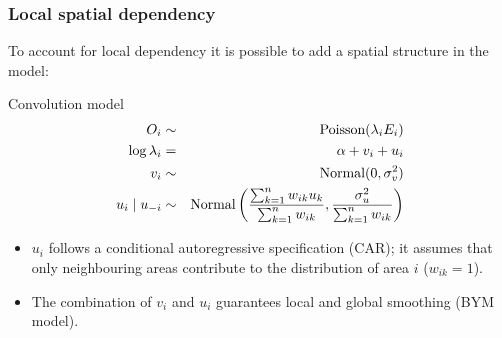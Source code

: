 \documentclass[slidestop,compress,serif,10pt]{beamer}
\begin{document}
\begin{frame}\frametitle{Local spatial dependency}

To account for local dependency it is possible to add a spatial structure in the model:
\begin{block}{Convolution model}
\vspace{-0.5cm}
\begin{eqnarray*}
O_i & \sim & \hbox{Poisson}(\lambda_i E_i) \\
\log \lambda_i & = & \alpha + v_i + u_i\\
v_i & \sim  & \hbox{Normal}(0, \sigma_v^2)\\
u_i \mid u_{-i} & \sim & \hbox{Normal}\left(\frac{\sum_{k=1}^n w_{ik} u_k}{\sum_{k=1}^n w_{ik}}, \frac{\sigma^2_u}{\sum_{k=1}^n w_{ik}}\right)\end{eqnarray*}
\end{block}
\begin{itemize}
  \item $u_i$ follows a conditional autoregressive specification (CAR); it assumes that only neighbouring areas contribute to the distribution of area $i$ ($w_{ik}=1$).
  \item The combination of $v_i$ and $u_i$ guarantees local and global smoothing (BYM model).
\end{itemize}

\fontsize{7}{7}
\end{frame}
\end{document}

